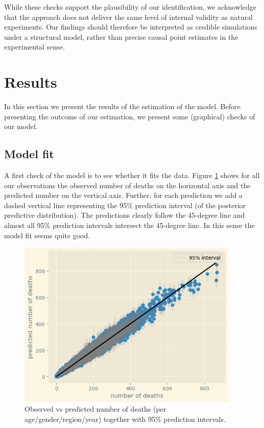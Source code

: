 \documentclass[a4paper,12pt]{article}
\begin{document}
While these checks support the plausibility of our identification, we acknowledge that the approach does not deliver the same level of internal validity as natural experiments. Our findings should therefore be interpreted as credible simulations under a structural model, rather than precise causal point estimates in the experimental sense.
\section{Results}
\label{sec:orga2e25b7}

In this section we present the results of the estimation of the model. Before presenting the outcome of our estimation, we present some (graphical) checks of our model.
\subsection{Model fit}
\label{sec:orga5944c6}

A first check of the model is to see whether it fits the data. Figure \ref{fig:modelfit} shows for all our observations the observed number of deaths on the horizontal axis and the predicted number on the vertical axis. Further, for each prediction we add a dashed vertical line representing the 95\% prediction interval (of the posterior predictive distribution). The predictions clearly follow the 45-degree line and almost all 95\% prediction intervals intersect the 45-degree line. In this sense the model fit seems quite good.

\begin{figure}[htbp]
\centering
\includegraphics[height=8cm]{./figures/fit_model.png}
\caption{\label{fig:modelfit}Observed vs predicted number of deaths (per age/gender/region/year) together with 95\% prediction intervals.}
\end{figure}
\end{document}
